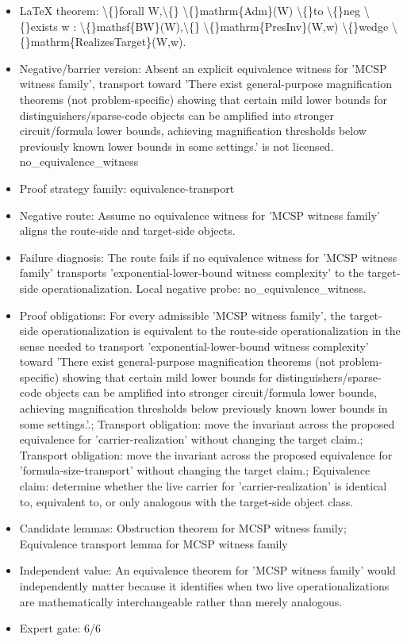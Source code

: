 \documentclass[11pt]{article}
\begin{document}
\begin{itemize}
\item LaTeX theorem: \textbackslash\{\}forall W,\textbackslash\{\} \textbackslash\{\}mathrm\{Adm\}(W) \textbackslash\{\}to \textbackslash\{\}neg \textbackslash\{\}exists w : \textbackslash\{\}mathsf\{BW\}(W),\textbackslash\{\} \textbackslash\{\}mathrm\{PresInv\}(W,w) \textbackslash\{\}wedge \textbackslash\{\}mathrm\{RealizesTarget\}(W,w).
\item Negative/barrier version: Absent an explicit equivalence witness for 'MCSP witness family', transport toward 'There exist general-purpose magnification theorems (not problem-specific) showing that certain mild lower bounds for distinguishers/sparse-code objects can be amplified into stronger circuit/formula lower bounds, achieving magnification thresholds below previously known lower bounds in some settings.' is not licensed. no\_equivalence\_witness
\item Proof strategy family: equivalence-transport
\item Negative route: Assume no equivalence witness for 'MCSP witness family' aligns the route-side and target-side objects.
\item Failure diagnosis: The route fails if no equivalence witness for 'MCSP witness family' transports 'exponential-lower-bound witness complexity' to the target-side operationalization. Local negative probe: no\_equivalence\_witness.
\item Proof obligations: For every admissible 'MCSP witness family', the target-side operationalization is equivalent to the route-side operationalization in the sense needed to transport 'exponential-lower-bound witness complexity' toward 'There exist general-purpose magnification theorems (not problem-specific) showing that certain mild lower bounds for distinguishers/sparse-code objects can be amplified into stronger circuit/formula lower bounds, achieving magnification thresholds below previously known lower bounds in some settings.'.; Transport obligation: move the invariant across the proposed equivalence for 'carrier-realization' without changing the target claim.; Transport obligation: move the invariant across the proposed equivalence for 'formula-size-transport' without changing the target claim.; Equivalence claim: determine whether the live carrier for 'carrier-realization' is identical to, equivalent to, or only analogous with the target-side object class.
\item Candidate lemmas: Obstruction theorem for MCSP witness family; Equivalence transport lemma for MCSP witness family
\item Independent value: An equivalence theorem for 'MCSP witness family' would independently matter because it identifies when two live operationalizations are mathematically interchangeable rather than merely analogous.
\item Expert gate: 6/6
\end{itemize}
\end{document}
